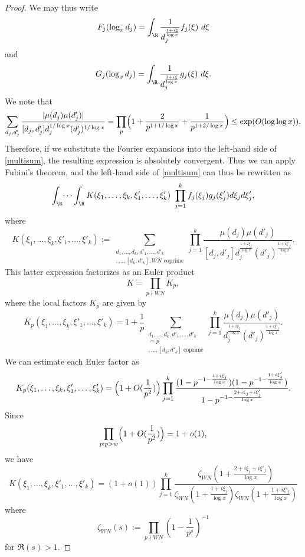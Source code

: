 \begin{proof}
We may thus write
$$ F_j( \log_x d_j ) = \int_\R \frac{1}{d_j^{\frac{1+i\xi}{\log x}}} f_j(\xi)\ d\xi$$
and
$$ G_j( \log_x d_j ) = \int_\R \frac{1}{d_j^{\frac{1+i\xi}{\log x}}} g_j(\xi)\ d\xi.$$
We note that
$$ \sum_{d_j,d_j'}\frac{|\mu(d_j)\mu(d_j')|}{[d_j,d_j']d_j^{1/\log{x}}(d_j')^{1/\log{x}}}= \prod_{p}\Bigl(1+\frac{2}{p^{1+1/\log{x}}}+\frac{1}{p^{1+2/\log{x}}}\Bigr)\le \exp(O(\log\log{x})).$$
Therefore, if we substitute the Fourier expansions into the left-hand side of \eqref{multisum}, the resulting expression is absolutely convergent. Thus we can apply Fubini's theorem, and the left-hand side of \eqref{multisum} can thus be rewritten as
\begin{equation}\label{fg-int}
 \int_\R \dots \int_\R K(\xi_1,\dots,\xi_k,\xi'_1,\dots,\xi'_k)\ \prod_{j=1}^k f_j(\xi_j) g_j(\xi'_j) d\xi_j d\xi'_j,
\end{equation}
where
$$ K(\xi_1,\dots,\xi_k,\xi'_1,\dots,\xi'_k) := 
\sum_{\substack{d_1, \dots, d_k, d'_1, \dots, d'_k \\ [d_1,d'_1], \dots, [d_k,d'_k], W N \text{ coprime}}} 
\prod_{j=1}^k \frac{\mu(d_j) \mu(d'_j)}{[d_j,d'_j] d_j^{\frac{1+i\xi_j}{\log x}} (d'_j)^{\frac{1+i\xi'_j}{\log x}}}.$$
This latter expression factorizes as an Euler product 
$$ K = \prod_{p\nmid WN} K_p, $$
where the local factors $K_p$ are given by
\begin{equation}\label{kp}
 K_p(\xi_1,\dots,\xi_k,\xi'_1,\dots,\xi'_k)
 = 1 + \frac{1}{p}
\sum_{\substack{d_1,\dots,d_k,d'_1,\dots,d'_k \\ [d_1, \dots, d_k, d'_1, \dots, d'_k]=p \\ [d_1,d'_1],\dots,[d_k,d'_k] \text{ coprime}}} 
\prod_{j=1}^k \frac{\mu(d_j) \mu(d'_j)}{d_j^{\frac{1+i\xi_j}{\log x}} (d'_j)^{\frac{1+i\xi'_j}{\log x}}}.
\end{equation}
We can estimate each Euler factor as
\begin{equation}\label{kp-est}
 K_p(\xi_1,\dots,\xi_k,\xi'_1,\dots,\xi'_k) = \Bigl(1+O(\frac{1}{p^2})\Bigr) \prod_{j=1}^k \frac{(1 - p^{-1-\frac{1+i\xi_j}{\log x}})(1 - p^{-1-\frac{1+i\xi'_j}{\log x}})}{1 - p^{-1-\frac{2+i\xi_j+i\xi'_j}{\log x}}}.
\end{equation}
Since 
$$ 
\prod_{p: p>w} \Bigl(1 + O(\frac{1}{p^2})\Bigr) = 1 + o(1),$$
we have
$$
 K(\xi_1,\dots,\xi_k,\xi'_1,\dots,\xi'_k) = (1+o(1)) \prod_{j=1}^k \frac{ \zeta_{W N}( 1 + \frac{2+i\xi_j+i\xi'_j}{\log x}) }{ \zeta_{W N}(1 + \frac{1+i\xi_j}{\log x}) \zeta_{W N}(1 + \frac{1+i\xi'_j}{\log x}) } $$
where
$$ \zeta_{W N}(s) := \prod_{p\nmid W N} \left(1-\frac{1}{p^s}\right)^{-1}$$
for $\Re(s) > 1$.  


\end{proof}
